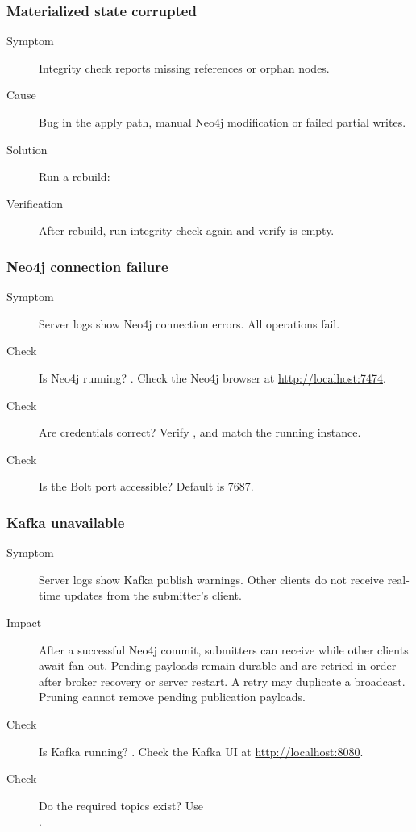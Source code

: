 \subsubsection{Materialized state corrupted}

\begin{description}
\item[Symptom] Integrity check reports missing references or orphan nodes.
\item[Cause] Bug in the apply path, manual Neo4j modification or failed
  partial writes.
\item[Solution] Run a rebuild: \\
\item[Verification] After rebuild, run integrity check again and verify
   is empty.
\end{description}

\subsubsection{Neo4j connection failure}

\begin{description}
\item[Symptom] Server logs show Neo4j connection errors. All operations fail.
\item[Check] Is Neo4j running? . Check the
  Neo4j browser at \url{http://localhost:7474}.
\item[Check] Are credentials correct? Verify ,
   and  match the running
  instance.
\item[Check] Is the Bolt port accessible? Default is 7687.
\end{description}

\subsubsection{Kafka unavailable}

\begin{description}
\item[Symptom] Server logs show Kafka publish warnings. Other clients do not
  receive real-time updates from the submitter's client.
\item[Impact] After a successful Neo4j commit, submitters can receive
   while other clients await fan-out. Pending payloads
  remain durable and are retried in order after broker recovery or server
  restart. A retry may duplicate a broadcast. Pruning cannot remove pending
  publication payloads.
\item[Check] Is Kafka running? . Check the
  Kafka UI at \url{http://localhost:8080}.
\item[Check] Do the required topics exist? Use \\
  .
\end{description}

